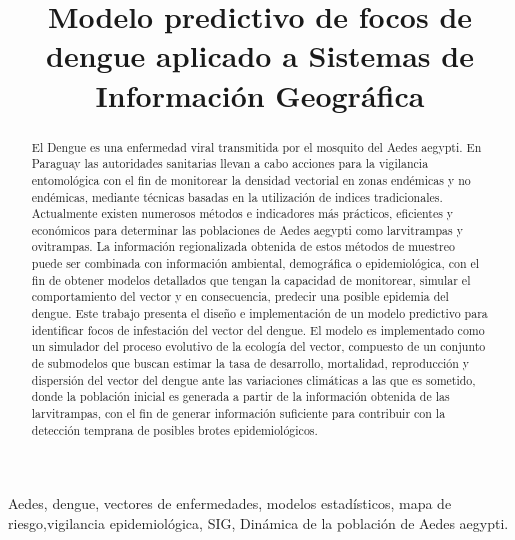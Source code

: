 \documentclass[conference]{IEEEtran}
\begin{document}
%
\title{Modelo predictivo de focos de dengue aplicado a Sistemas de Información Geográfica}


\author{
}
\maketitle

\begin{abstract}
El Dengue es una enfermedad viral transmitida por el mosquito del Aedes aegypti. En Paraguay las autoridades sanitarias llevan a cabo acciones para la vigilancia entomológica con el fin de monitorear la densidad vectorial en zonas endémicas y no endémicas, mediante técnicas basadas en la utilización de indices tradicionales. Actualmente existen numerosos métodos e indicadores más prácticos, eficientes y económicos para determinar las poblaciones de Aedes aegypti como larvitrampas y ovitrampas. La información regionalizada obtenida de estos métodos de muestreo puede ser combinada con información ambiental, demográfica o epidemiológica, con el fin de obtener modelos detallados que tengan la capacidad de monitorear, simular el comportamiento del vector y en consecuencia, predecir una posible epidemia del dengue. Este trabajo presenta el diseño e implementación de un modelo predictivo para identificar focos de infestación del vector del dengue. El modelo es implementado como un simulador del proceso evolutivo de la ecología del vector, compuesto de un conjunto de submodelos que buscan estimar la tasa de desarrollo, mortalidad, reproducción y dispersión del vector del dengue ante las variaciones climáticas a las que es sometido, donde la población inicial es generada a partir de la información obtenida de las larvitrampas, con el fin de generar información suficiente para contribuir con la detección temprana de posibles brotes epidemiológicos.
\end{abstract}

\begin{IEEEkeywords}
Aedes, dengue, vectores de enfermedades, modelos estadísticos, mapa de riesgo,vigilancia  epidemiológica, SIG, Dinámica de la población de Aedes aegypti.
\end{IEEEkeywords}

\IEEEpeerreviewmaketitle






\printbibliography

\end{document}
